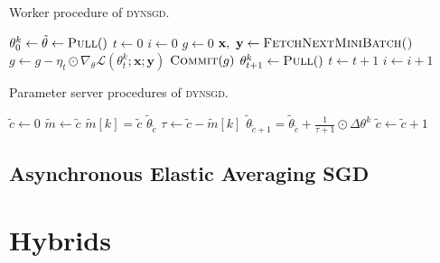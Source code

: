 \begin{algorithm}[H]
  \caption{Worker procedure of \textsc{dynsgd}.}
  \label{algo:dynsgd_worker}
  \begin{algorithmic}[1]
    \State $\theta^k_0 \gets \tilde{\theta} \gets \Call{Pull}$
    \State $t \gets 0$
    \State $i \gets 0$
    \State $g \gets 0$
    \State $\textbf{x},~\textbf{y} \gets \Call{FetchNextMiniBatch()}{}$
    \State $g \gets g -\eta_t \odot \nabla_\theta \mathcal{L}(\theta^k_t;\textbf{x};\textbf{y})$
    \State $\Call{Commit}{g}$
    \State $\theta^k_{t + 1} \gets \Call{Pull}$
    \EndIf
    \State $t \gets t + 1$
    \State $i \gets i + 1$
    \EndWhile
    \EndWhile
    \EndProcedure
  \end{algorithmic}
\end{algorithm}

\begin{algorithm}[H]
  \caption{Parameter server procedures of \textsc{dynsgd}.}
  \label{algo:dynsgd_parameter_server}
  \begin{algorithmic}[1]
    \State $\tilde{c} \gets 0$ 
    \State $\tilde{m} \gets \tilde{c}$ 
     
    \State $\tilde{m}[k] = \tilde{c}$
    \State \Return $\tilde{\theta}_{\tilde{c}}$
    \EndProcedure
    \State $\tau \gets \tilde{c} - \tilde{m}[k]$
    \State $\tilde{\theta}_{\tilde{c} + 1} = \tilde{\theta}_{\tilde{c}} + \frac{1}{\tau + 1} \odot \Delta\theta^k$  
    \State $\tilde{c} \gets \tilde{c} + 1$
    \EndProcedure
    \EndProcedure
  \end{algorithmic}
\end{algorithm}

\subsection{Asynchronous Elastic Averaging SGD}
\label{sec:aeasgd}

\section{Hybrids}
\label{sec:hybrids}
